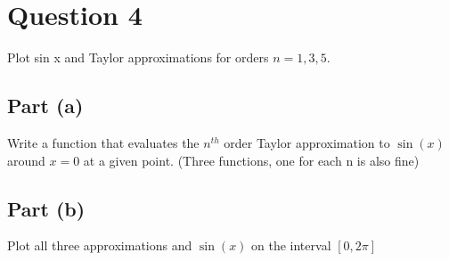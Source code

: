\section{Question 4}

\begin{question}
   Plot sin x and Taylor approximations for orders $n = 1,3,5$.
\end{question}

\subsection{Part (a)}

\begin{question}
    Write a function that evaluates the $n^{th}$ order Taylor approximation to $\sin{(x)}$ around $x = 0$ at a given point. (Three functions, one for each n is also fine)
\end{question}

\begin{answer}
    
\end{answer}

\subsection{Part (b)}

\begin{question}
    Plot all three approximations and $\sin{(x)}$ on the interval $[0,2\pi]$
\end{question}

\begin{answer}
    
\end{answer}